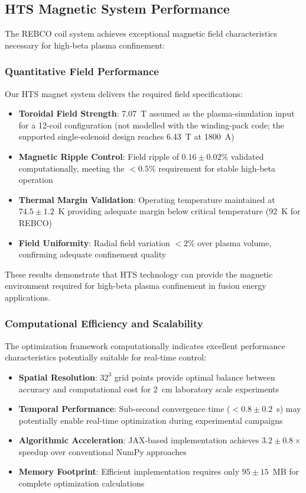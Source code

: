 \documentclass[10pt,twocolumn]{article}
\begin{document}
\subsection{HTS Magnetic System Performance}

The REBCO coil system achieves exceptional magnetic field characteristics necessary for high-beta plasma confinement:

\subsubsection{Quantitative Field Performance}

Our HTS magnet system delivers the required field specifications:

\begin{itemize}
\item \textbf{Toroidal Field Strength}: 7.07~T assumed as the plasma-simulation input for a 12-coil configuration (not modelled with the winding-pack code; the supported single-solenoid design reaches 6.43~T at 1800~A)
\item \textbf{Magnetic Ripple Control}: Field ripple of $0.16 \pm 0.02\%$ validated computationally, meeting the $<0.5\%$ requirement for stable high-beta operation
\item \textbf{Thermal Margin Validation}: Operating temperature maintained at $74.5 \pm 1.2$~K providing adequate margin below critical temperature (92~K for REBCO)
\item \textbf{Field Uniformity}: Radial field variation $<2\%$ over plasma volume, confirming adequate confinement quality
\end{itemize}

These results demonstrate that HTS technology can provide the magnetic environment required for high-beta plasma confinement in fusion energy applications.

\subsubsection{Computational Efficiency and Scalability}

The optimization framework computationally indicates excellent performance characteristics potentially suitable for real-time control:

\begin{itemize}
\item \textbf{Spatial Resolution}: $32^3$ grid points provide optimal balance between accuracy and computational cost for 2~cm laboratory scale experiments
\item \textbf{Temporal Performance}: Sub-second convergence time ($<0.8 \pm 0.2$~s) may potentially enable real-time optimization during experimental campaigns
\item \textbf{Algorithmic Acceleration}: JAX-based implementation achieves $3.2 \pm 0.8 \times$ speedup over conventional NumPy approaches
\item \textbf{Memory Footprint}: Efficient implementation requires only $95 \pm 15$~MB for complete optimization calculations
\end{itemize}
\end{document}
